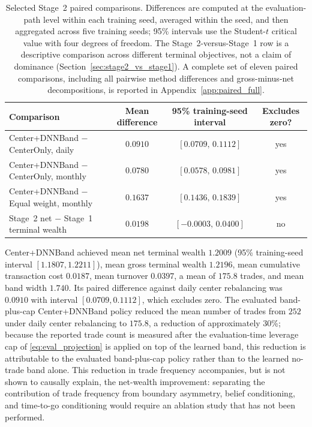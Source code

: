 \documentclass[a4paper,10pt]{article}
\begin{document}
\begin{table}[H]
\centering
\small
\caption{Selected Stage~2 paired comparisons. Differences are computed at the evaluation-path level within each training seed, averaged within the seed, and then aggregated across five training seeds; 95\% intervals use the Student-$t$ critical value with four degrees of freedom. The Stage~2-versus-Stage~1 row is a descriptive comparison across different terminal objectives, not a claim of dominance (Section~\ref{sec:stage2_vs_stage1}). A complete set of eleven paired comparisons, including all pairwise method differences and gross-minus-net decompositions, is reported in Appendix~\ref{app:paired_full}.}
\label{tab:paired_comparisons}
\begin{tabular}{lccc}
\toprule
Comparison & Mean difference & 95\% training-seed interval & Excludes zero? \\
\midrule
Center+DNNBand $-$ CenterOnly, daily & $0.0910$ & $[0.0709,\,0.1112]$ & yes \\
Center+DNNBand $-$ CenterOnly, monthly & $0.0780$ & $[0.0578,\,0.0981]$ & yes \\
Center+DNNBand $-$ Equal weight, monthly & $0.1637$ & $[0.1436,\,0.1839]$ & yes \\
Stage~2 net $-$ Stage~1 terminal wealth & $0.0198$ & $[-0.0003,\,0.0400]$ & no \\
\bottomrule
\end{tabular}
\end{table}

Center+DNNBand achieved mean net terminal wealth $1.2009$ (95\% training-seed interval $[1.1807,1.2211]$), mean gross terminal wealth $1.2196$, mean cumulative transaction cost $0.0187$, mean turnover $0.0397$, a mean of $175.8$ trades, and mean band width $1.740$. Its paired difference against daily center rebalancing was $0.0910$ with interval $[0.0709,0.1112]$, which excludes zero. The evaluated band-plus-cap Center+DNNBand policy reduced the mean number of trades from $252$ under daily center rebalancing to $175.8$, a reduction of approximately 30\%; because the reported trade count is measured after the evaluation-time leverage cap of \eqref{eq:eval_projection} is applied on top of the learned band, this reduction is attributable to the evaluated band-plus-cap policy rather than to the learned no-trade band alone. This reduction in trade frequency accompanies, but is not shown to causally explain, the net-wealth improvement: separating the contribution of trade frequency from boundary asymmetry, belief conditioning, and time-to-go conditioning would require an ablation study that has not been performed.
\end{document}
